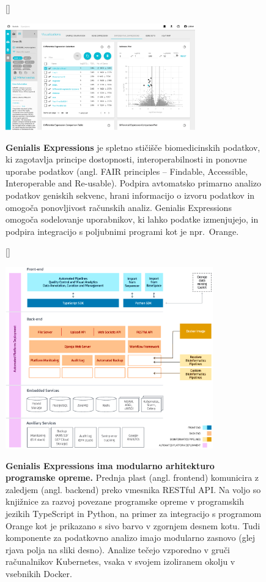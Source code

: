 \documentclass[11pt,a4paper]{article}
\renewcommand{\bold}{\textbf}
\begin{document}
\begin{figure}[htbp]
[\FBwidth]
{\caption{\small\bold{Genialis Expressions} je spletno stičišče biomedicinskih podatkov, ki zagotavlja principe dostopnosti, interoperabilnosti in ponovne uporabe podatkov (angl. FAIR principles -- Findable, Accessible, Interoperable and Re-usable). Podpira avtomatsko primarno analizo podatkov geniskih sekvenc, hrani informacijo o izvoru podatkov in omogoča ponovljivost računskih analiz. Genialis Expressions omogoča sodelovanje uporabnikov, ki lahko podatke izmenjujejo, in podpira integracijo s poljubnimi programi kot je npr.~Orange.}
\label{fig:genialis-expressions-frontend}}
{\includegraphics[width=0.73\textwidth]{genialis-expressions-frontend}}
\end{figure}

\begin{figure}[htbp]
[\FBwidth]
{\caption{\small\bold{Genialis Expressions ima modularno arhitekturo programske opreme.} Prednja plast (angl. frontend) komunicira z zaledjem (angl. backend) preko vmesnika RESTful API. Na voljo so knjižnice za razvoj povezane programske opreme v programskih jezikih TypeScript in Python, na primer za integracijo s programom Orange kot je prikazano s sivo barvo v zgornjem desnem kotu. Tudi komponente za podatkovno analizo imajo modularno zasnovo (glej rjava polja na sliki desno). Analize tečejo vzporedno v gruči računalnikov Kubernetes, vsaka v svojem izoliranem okolju v vsebnikih Docker.}
\label{fig:genialis-expressions-software-components}}
{\includegraphics[width=0.8\textwidth]{genialis-expressions-software-components}}
\end{figure}
\end{document}
